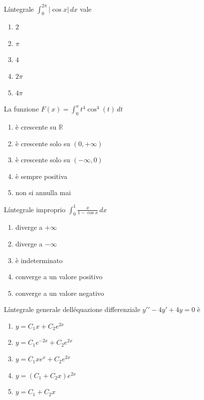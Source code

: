 \begin{quiz}
L\'integrale $\displaystyle\int_0^{2\pi}|\cos x|\,dx$ vale
\begin{enumerate}[label=\alph*),leftmargin=1.3cm,itemsep=3pt,topsep=5pt]
\item $2$
\item $\pi$
\item $4$
\item $2\pi$
\item $4\pi$
\end{enumerate}
\end{quiz}

\begin{quiz}
La funzione $F(x)=\displaystyle\int_0^x t^4\cos^4(t)\,dt$
\begin{enumerate}[label=\alph*),leftmargin=1.3cm,itemsep=3pt,topsep=5pt]
\item \`e crescente su $\mathbb R$
\item \`e crescente solo su $(0,+\infty)$
\item \`e crescente solo su $(-\infty,0)$
\item \`e sempre positiva
\item non si annulla mai
\end{enumerate}
\end{quiz}

\begin{quiz}
L\'integrale improprio $\displaystyle\int_0^1\frac{x}{1-\cos x}\,dx$
\begin{enumerate}[label=\alph*),leftmargin=1.3cm,itemsep=3pt,topsep=5pt]
\item diverge a $+\infty$
\item diverge a $-\infty$
\item \`e indeterminato
\item converge a un valore positivo
\item converge a un valore negativo
\end{enumerate}
\end{quiz}

\begin{quiz}
L\'integrale generale dell\'equazione differenziale $y\prime\prime-4y\prime+4y=0$ \`e
\begin{enumerate}[label=\alph*),leftmargin=1.3cm,itemsep=3pt,topsep=5pt]
\item $y=C_1x+C_2e^{2x}$
\item $y=C_1e^{-2x}+C_2e^{2x}$
\item $y=C_1xe^x+C_2e^{2x}$
\item $y=(C_1+C_2x)e^{2x}$
\item $y=C_1+C_2x$
\end{enumerate}
\end{quiz}

